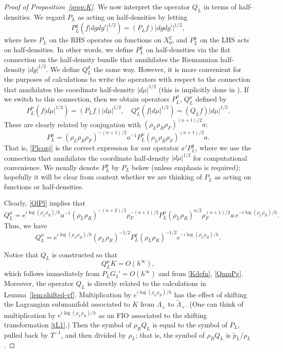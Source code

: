 \documentclass[10pt, a4paper, twoside]{amsart}
\numberwithin{equation}{section}
\theoremstyle{remark}
\begin{document}
\begin{proof}[Proof of Proposition~\ref{prop:K}]
We now interpret the operator $Q_L$ in terms of  half-densities. We regard $P_L$ as acting on half-densities by letting
$$
P_L^g ( f |dgdg'|^{1/2}) = (P_L f) |dgdg'|^{1/2},
$$
where here $P_L$ on the RHS operates on functions on $X^2_0$, and $P_L^g$ on the LHS acts on half-densities. In other words, we define $P_L^g$ on half-densities via the flat connection on the half-density bundle that annihilates the Riemannian half-density $|dg|^{1/2}$. We define $Q_L^g$ the same way. However, it is more convenient for the purposes of calculations to write the operators with respect to the connection that annihilates the coordinate half-density $|d\mu|^{1/2}$ (this is implicitly done in \cite{Duistermaat-Hormander-Acta-1972}). If we switch to this connection, then we obtain operators $P_L^\mu$, $Q_L^\mu$ defined by 
$$
P_L^\mu ( f |d\mu|^{1/2}) = (P_L f) |d\mu|^{1/2}, \quad Q_L^\mu ( f |d\mu|^{1/2}) = (Q_L f) |d\mu|^{1/2}. 
$$
These are clearly related by conjugation with $(\rho_L \rho_R \rho_F)^{(n+1)/2} a$: 
$$
P_L^g = (\rho_L \rho_R \rho_F)^{-(n+1)/2} a^{-1} P_L^\mu (\rho_L \rho_R \rho_F)^{(n+1)/2} a .
$$
That is, \eqref{Plconj} is the correct expression for our operator $x' P_L^g$,  where we use the connection that annihilates the coordinate half-density $|d\mu|^{1/2}$ for computational convenience. We usually denote $P_L^g$ by $P_L$ below (unless emphasis is required); hopefully it will be clear from context  whether we are thinking of $P_L$ as acting on functions or half-densities. 

Clearly, \eqref{QlPl} implies that
$$
Q_L^\mu = e^{i\log (\rho_L \rho_R)/h} a^{-1} (\rho_L \rho_R)^{-(n+2)/2}  \rho_F^{-(n+1)/2} P_L^\mu (\rho_L \rho_R)^{n/2}  \rho_F^{(n+1)/2} a \, e^{-i\log (\rho_L \rho_R)/h}.
$$
Thus, we have 
\begin{equation}
Q_L^\mu =  e^{i\log (\rho_L \rho_R)/h} (\rho_L \rho_R)^{-1/2} P_L^g (\rho_L \rho_R)^{-1/2} e^{-i\log (\rho_L \rho_R)/h}.
\label{QmuPg}\end{equation}

Notice that $Q_L$ is constructed so that 
\begin{equation}
Q_L^\mu K = O(h^\infty),
\end{equation}
which follows immediately from $P_L G_3' = O(h^\infty)$ and from \eqref{Kdefn}, \eqref{QmuPg}. 
Moreover, the operator $Q_L$ is directly related to the calculations in Lemma~\ref{lem:shifted-vf}. Multiplication by $e^{i\log (\rho_L \rho_R)/h}$ has the effect of shifting the Lagrangian submanifold associated to $K$ from $\Lambda_+$ to ${\tilde \Lambda}_+$. (One can think of multiplication by $e^{i\log (\rho_L \rho_R)/h}$ as an FIO associated to the shifting transformation \eqref{tL1}.) Then the symbol of $\rho_R Q_L$ is equal to the symbol of $P_L$, pulled back by $T^{-1}$, and then divided by $\rho_L$; that is, the symbol of $\rho_R Q_L$ is ${\tilde p_L}/\rho_L$. 


\end{proof}
\end{document}
